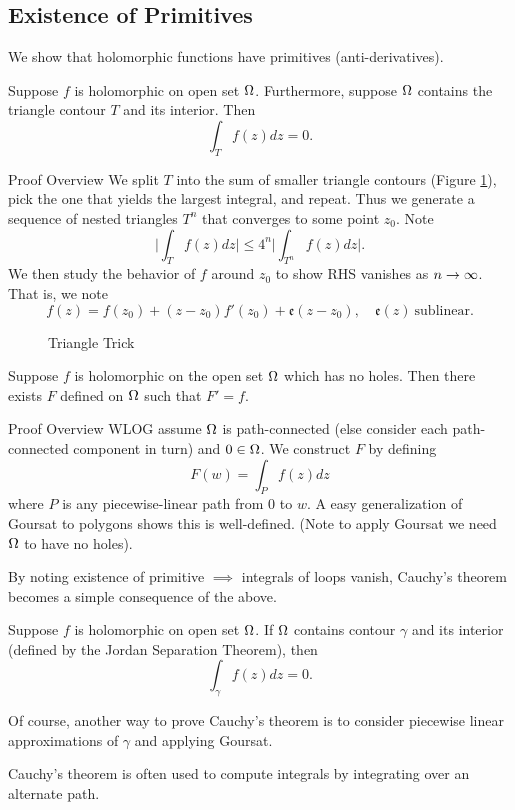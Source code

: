 \subsection{Existence of Primitives}
We show that holomorphic functions have primitives (anti-derivatives).
\begin{lem}[Goursat]
    Suppose $f$ is holomorphic on open set $\Omega$. Furthermore, suppose $\Omega$ contains the triangle contour $T$ and its interior. Then
    \[
        \int_T f(z) dz = 0.
    \]
\end{lem}
\begin{details}{Proof Overview}
    We split $T$ into the sum of smaller triangle contours (Figure \ref{fig:triangle_trick}), pick the one that yields the largest integral, and repeat. Thus we generate a sequence of nested triangles $T^n$ that converges to some point $z_0$. Note
    \[
        \Big| \int_T f(z) dz \Big| \leq 4^n \Big| \int_{T^n} f(z) dz \Big|.
    \]
    We then study the behavior of $f$ around $z_0$ to show RHS vanishes as $n \rightarrow \infty$. That is, we note
    \[
        f(z) = f(z_0) + (z-z_0)f'(z_0) + \mathfrak e(z-z_0), \quad \mathfrak e(z) \ \text{sublinear.}
    \]
\end{details}
\begin{figure}[ht]
    \centering
    \caption{Triangle Trick}
    \label{fig:triangle_trick}
\end{figure}
\begin{thm}
    Suppose $f$ is holomorphic on the open set $\Omega$ which has no holes. Then there exists $F$ defined on $\Omega$ such that $F' = f$.
\end{thm}
\begin{details}{Proof Overview}
    WLOG assume $\Omega$ is path-connected (else consider each path-connected component in turn) and $0 \in \Omega$. We construct $F$ by defining
    \[
        F(w) = \int_P f(z)dz
    \]
    where $P$ is any piecewise-linear path from $0$ to $w$. A easy generalization of Goursat to polygons shows this is well-defined. (Note to apply Goursat we need $\Omega$ to have no holes).
\end{details}

By noting existence of primitive $\implies$ integrals of loops vanish, Cauchy's theorem becomes a simple consequence of the above.
\begin{cor}
    Suppose $f$ is holomorphic on open set $\Omega$. If $\Omega$ contains contour $\gamma$ and its interior (defined by the Jordan Separation Theorem), then
    \[
        \int_\gamma f(z) dz = 0.
    \]
\end{cor}
Of course, another way to prove Cauchy's theorem is to consider piecewise linear approximations of $\gamma$ and applying Goursat.
\begin{remark}
    Cauchy's theorem is often used to compute integrals by integrating over an alternate path.
\end{remark}
